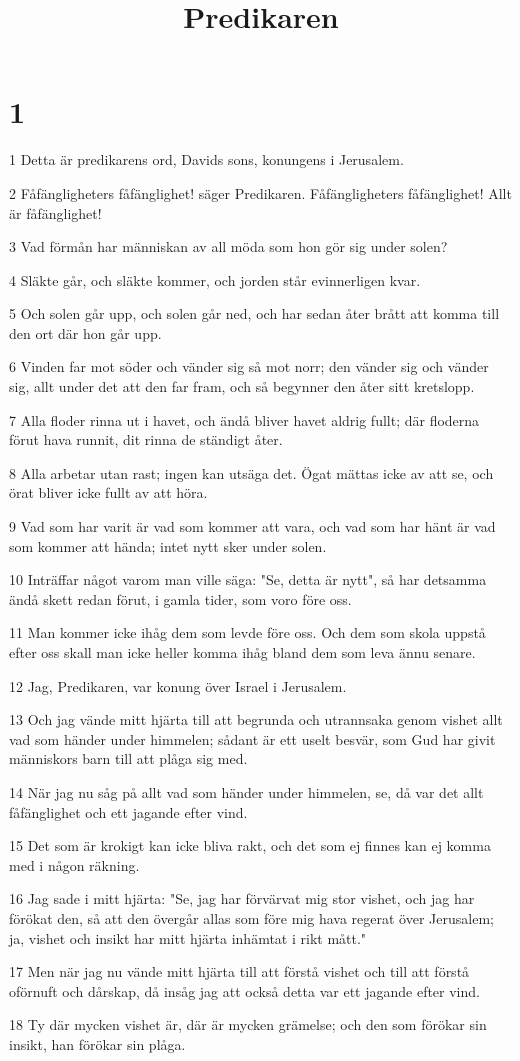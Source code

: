 

\title{Predikaren}


\chapter{1}

\par 1 Detta är predikarens ord, Davids sons, konungens i Jerusalem.
\par 2 Fåfängligheters fåfänglighet! säger Predikaren. Fåfängligheters fåfänglighet! Allt är fåfänglighet!
\par 3 Vad förmån har människan av all möda som hon gör sig under solen?
\par 4 Släkte går, och släkte kommer, och jorden står evinnerligen kvar.
\par 5 Och solen går upp, och solen går ned, och har sedan åter brått att komma till den ort där hon går upp.
\par 6 Vinden far mot söder och vänder sig så mot norr; den vänder sig och vänder sig, allt under det att den far fram, och så begynner den åter sitt kretslopp.
\par 7 Alla floder rinna ut i havet, och ändå bliver havet aldrig fullt; där floderna förut hava runnit, dit rinna de ständigt åter.
\par 8 Alla arbetar utan rast; ingen kan utsäga det. Ögat mättas icke av att se, och örat bliver icke fullt av att höra.
\par 9 Vad som har varit är vad som kommer att vara, och vad som har hänt är vad som kommer att hända; intet nytt sker under solen.
\par 10 Inträffar något varom man ville säga: "Se, detta är nytt", så har detsamma ändå skett redan förut, i gamla tider, som voro före oss.
\par 11 Man kommer icke ihåg dem som levde före oss. Och dem som skola uppstå efter oss skall man icke heller komma ihåg bland dem som leva ännu senare.
\par 12 Jag, Predikaren, var konung över Israel i Jerusalem.
\par 13 Och jag vände mitt hjärta till att begrunda och utrannsaka genom vishet allt vad som händer under himmelen; sådant är ett uselt besvär, som Gud har givit människors barn till att plåga sig med.
\par 14 När jag nu såg på allt vad som händer under himmelen, se, då var det allt fåfänglighet och ett jagande efter vind.
\par 15 Det som är krokigt kan icke bliva rakt, och det som ej finnes kan ej komma med i någon räkning.
\par 16 Jag sade i mitt hjärta: "Se, jag har förvärvat mig stor vishet, och jag har förökat den, så att den övergår allas som före mig hava regerat över Jerusalem; ja, vishet och insikt har mitt hjärta inhämtat i rikt mått."
\par 17 Men när jag nu vände mitt hjärta till att förstå vishet och till att förstå oförnuft och dårskap, då insåg jag att också detta var ett jagande efter vind.
\par 18 Ty där mycken vishet är, där är mycken grämelse; och den som förökar sin insikt, han förökar sin plåga.


